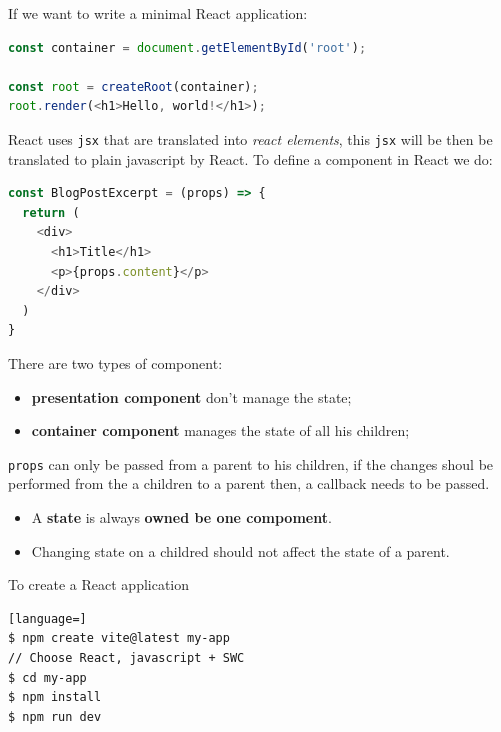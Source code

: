 \documentclass[12pt]{article}
\begin{document}
If we want to write a minimal React application:
\begin{lstlisting}[language=js]
const container = document.getElementById('root');

const root = createRoot(container);
root.render(<h1>Hello, world!</h1>);
\end{lstlisting}
React uses \texttt{jsx} that are translated into \emph{react elements}, this \texttt{jsx} will be then be translated to plain javascript by React. To define a component in React we do:
\begin{lstlisting}[language=js]
const BlogPostExcerpt = (props) => {
  return (
    <div>
      <h1>Title</h1>
      <p>{props.content}</p>
    </div>
  )
}
\end{lstlisting}
There are two types of component: 
\begin{itemize}
  \item \textbf{presentation component} don't manage the state;
  \item \textbf{container component} manages the state of all his children;
\end{itemize}
\texttt{props} can only be passed from a parent to his children, if the changes shoul be performed from the a children to a parent then, a callback needs to be passed.
\begin{center}
\end{center}
\begin{itemize}
  \item A \textbf{state} is always \textbf{owned be one compoment}.
  \item Changing state on a childred should not affect the state of a parent.
\end{itemize}
To create a React application
\begin{lstlisting}[language=]
$ npm create vite@latest my-app
// Choose React, javascript + SWC
$ cd my-app
$ npm install
$ npm run dev
\end{lstlisting}
\end{document}
